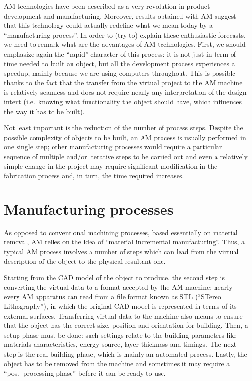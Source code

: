 
AM technologies have been described as a very revolution in product development and manufacturing. Moreover, results obtained with AM suggest that this technology could actually redefine what we mean today by a ``manufacturing process''. In order to (try to) explain these enthusiastic forecasts, we need to remark what are the advantages of AM technologies. First, we should emphasize again the ``rapid'' character of this process: it is not just in term of time needed to built an object, but all the development process experiences a speedup, mainly because we are using computers throughout. This is possible thanks to the fact that the transfer from the virtual project to the AM machine is relatively seamless and does not require nearly any interpretation of the design intent (i.e.\ knowing what functionality the object should have, which influences the way it has to be built).

Not least important is the reduction of the number of process steps. Despite the possible complexity of objects to be built, an AM process is usually performed in one single step; other manufacturing processes would require a particular sequence of multiple and/or iterative steps to be carried out and even a relatively simple change in the project may require significant modification in the fabrication process and, in turn, the time required increases.





\section{Manufacturing processes}
As opposed to conventional machining processes, based essentially on material removal, AM relies on the idea of ``material incremental manufacturing''. Thus, a typical AM process involves a number of steps which can lead from the virtual description of the object to the physical resultant one.

Starting from the CAD model of the object to produce, the second step is converting the virtual data to a format accepted by the AM machine; nearly every AM apparatus can read from a file format known as STL (``STereo Lithography''), in which the original CAD model is represented in terms of its external surfaces. Transferring virtual data to the machine also means to ensure that the object has the correct size, position and orientation for building. Then, a setup phase must be done: such settings relate to the building parameters like materials characteristics, energy source, layer thickness and timings.
The next step is the real building phase, which is mainly an automated process. Lastly, the object has to be removed from the machine and sometimes it may require a ``post--processing phase'' before it can be ready to use.

